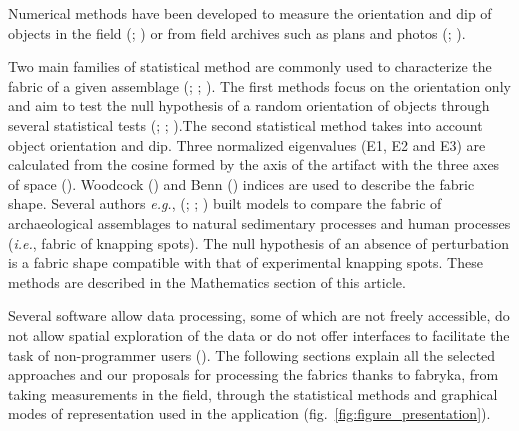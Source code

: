 \documentclass[
]{article}
\begin{document}
Numerical methods have been developed to measure the orientation and dip
of objects in the field (; ) or
from field archives such as plans and photos
(;
).

Two main families of statistical method are commonly used to
characterize the fabric of a given assemblage
(;
;
). \newline The first methods
focus on the orientation only and aim to test the null hypothesis of a
random orientation of objects through several statistical tests
(;
; ).\newline The second statistical method takes into account object
orientation and dip. Three normalized eigenvalues (E1, E2 and E3) are
calculated from the cosine formed by the axis of the artifact with the
three axes of space (). Woodcock
() and Benn
() indices are used to describe the fabric
shape. Several authors \emph{e.g.}, (; ;
) built models to
compare the fabric of archaeological assemblages to natural sedimentary
processes and human processes (\emph{i.e.}, fabric of knapping spots).
The null hypothesis of an absence of perturbation is a fabric shape
compatible with that of experimental knapping spots. These methods are
described in the Mathematics section of this article.

Several software allow data processing, some of which are not freely
accessible, do not allow spatial exploration of the data or do not offer
interfaces to facilitate the task of non-programmer users
(). The following
sections explain all the selected approaches and our proposals for
processing the fabrics thanks to fabryka, from taking measurements in
the field, through the statistical methods and graphical modes of
representation used in the application
(fig.~\ref{fig:figure_presentation}). \bigbreak
\end{document}
